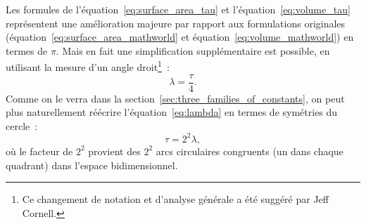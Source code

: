 Les formules de l'équation~\eqref{eq:surface_area_tau} et
l'équation~\eqref{eq:volume_tau} représentent une amélioration majeure par
rapport aux formulations originales
(équation~\eqref{eq:surface_area_mathworld} et
équation~\eqref{eq:volume_mathworld}) en termes de $\pi$. Mais en fait une
simplification supplémentaire est possible, en utilisant la mesure d'un angle
droit\ns\footnote{Ce changement de notation et d'analyse générale a été suggéré
par Jeff Cornell.}~:
\begin{equation}
\label{eq:lambda}
\lambda = \frac{\tau}{4}.
\end{equation}
Comme on le verra dans la section~\ref{sec:three_families_of_constants}, on peut
plus naturellement réécrire l'équation~\eqref{eq:lambda} en termes de symétries
du cercle~:
\begin{equation}
\label{eq:tau_lambda}
\tau = 2^2 \lambda,
\end{equation}
où le facteur de $2^2$ provient des $2^2$ arcs circulaires congruents (un dans
chaque quadrant) dans l'espace bidimensionnel.

